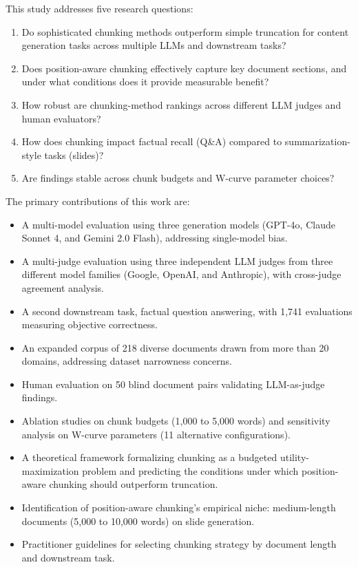 \documentclass{ieeeaccess}
\begin{document}
This study addresses five research questions:
\begin{enumerate}
    \item Do sophisticated chunking methods outperform simple truncation for content generation tasks across multiple LLMs and downstream tasks?
    \item Does position-aware chunking effectively capture key document sections, and under what conditions does it provide measurable benefit?
    \item How robust are chunking-method rankings across different LLM judges and human evaluators?
    \item How does chunking impact factual recall (Q\&A) compared to summarization-style tasks (slides)?
    \item Are findings stable across chunk budgets and W-curve parameter choices?
\end{enumerate}

The primary contributions of this work are:
\begin{itemize}
    \item A multi-model evaluation using three generation models (GPT-4o, Claude Sonnet 4, and Gemini 2.0 Flash), addressing single-model bias.
    \item A multi-judge evaluation using three independent LLM judges from three different model families (Google, OpenAI, and Anthropic), with cross-judge agreement analysis.
    \item A second downstream task, factual question answering, with 1,741 evaluations measuring objective correctness.
    \item An expanded corpus of 218 diverse documents drawn from more than 20 domains, addressing dataset narrowness concerns.
    \item Human evaluation on 50 blind document pairs validating LLM-as-judge findings.
    \item Ablation studies on chunk budgets (1,000 to 5,000 words) and sensitivity analysis on W-curve parameters (11 alternative configurations).
    \item A theoretical framework formalizing chunking as a budgeted utility-maximization problem and predicting the conditions under which position-aware chunking should outperform truncation.
    \item Identification of position-aware chunking's empirical niche: medium-length documents (5,000 to 10,000 words) on slide generation.
    \item Practitioner guidelines for selecting chunking strategy by document length and downstream task.
\end{itemize}
\end{document}

